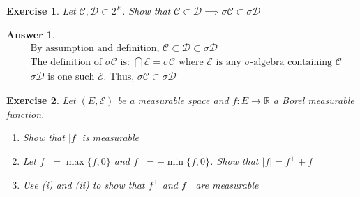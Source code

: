 \documentclass[12pt]{article}
\theoremstyle{colon}
\newtheorem{exercise}{Exercise}
\newtheorem*{answer}{Answer}
\begin{document}
\clearpage

\begin{exercise}
  Let $\mathcal{C}, \mathcal{D} \subset 2^E$. Show that $\mathcal{C} \subset \mathcal{D} \implies \sigma \mathcal{C} \subset \sigma \mathcal{D}$
\end{exercise}

\begin{answer}
  \leavevmode
  \begin{align*}
    &\text{By assumption and definition, } \mathcal{C} \subset \mathcal{D} \subset \sigma \mathcal{D} \\
    &\text{The definition of $\sigma \mathcal{C}$ is: } \bigcap \mathcal{E} = \sigma \mathcal{C} \text{ where $\mathcal{E}$ is any $\sigma$-algebra containing $\mathcal{C}$} \\
    &\sigma \mathcal{D} \text{ is one such $\mathcal{E}$. Thus, } \sigma \mathcal{C} \subset \sigma \mathcal{D}
  \end{align*}
\end{answer}

\clearpage

\begin{exercise}
  Let $(E, \mathcal{E})$ be a measurable space and $f: E \rightarrow \mathbb{R}$ a Borel measurable function.
  \begin{enumerate}[label=(\roman*)]
    \item Show that $|f|$ is measurable
    \item Let $f^+ = \max \{f, 0\}$ and $f^- = -\min \{f, 0\}$. Show that $|f| = f^+ + f^-$
    \item Use (i) and (ii) to show that $f^+$ and $f^-$ are measurable
  \end{enumerate}
\end{exercise}
\end{document}
